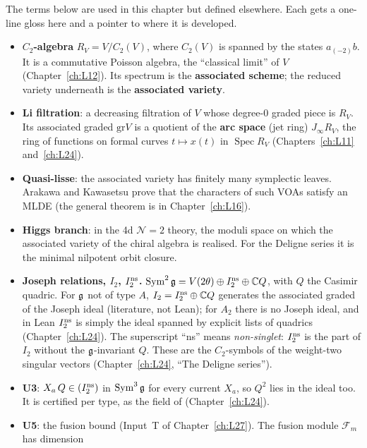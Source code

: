 The terms below are used in this chapter but defined elsewhere. Each gets a one-line gloss here and a pointer to
where it is developed.
\begin{itemize}
\item \textbf{$C_2$-algebra} $R_V=V/C_2(V)$, where $C_2(V)$ is spanned by the states $a_{(-2)}b$. It is a
  commutative Poisson algebra, the ``classical limit'' of $V$ (Chapter~\ref{ch:L12}). Its spectrum is the
  \textbf{associated scheme}; the reduced variety underneath is the \textbf{associated variety}.
\item \textbf{Li filtration}: a decreasing filtration of $V$ whose degree-$0$ graded piece is $R_V$. Its associated
  graded $\mathrm{gr}V$ is a quotient of the \textbf{arc space} (jet ring) $J_\infty R_V$, the ring of functions on
  formal curves $t\mapsto x(t)$ in $\operatorname{Spec}R_V$ (Chapters~\ref{ch:L11} and~\ref{ch:L24}).
\item \textbf{Quasi-lisse}: the associated variety has finitely many symplectic leaves. Arakawa and Kawasetsu prove
  that the characters of such VOAs satisfy an MLDE (the general theorem is in Chapter~\ref{ch:L16}).
\item \textbf{Higgs branch}: in the 4d $\mathcal N=2$ theory, the moduli space on which the associated variety of the
  chiral algebra is realised. For the Deligne series it is the minimal nilpotent orbit closure.
\item \textbf{Joseph relations, $I_2$, $I_2^{\rm ns}$.} $\operatorname{Sym}^2\mathfrak g=V(2\theta)\oplus
  I_2^{\rm ns}\oplus{\mathbb{C}} Q$, with $Q$ the Casimir quadric. For $\mathfrak g$ not of type $A$, $I_2=I_2^{\rm ns}\oplus{\mathbb{C}} Q$
  generates the associated graded of the Joseph ideal (literature, not Lean); for $A_2$ there is no Joseph ideal, and
  in Lean $I_2^{\rm ns}$ is simply the ideal spanned by explicit lists of quadrics (Chapter~\ref{ch:L24}). The superscript ``ns'' means \emph{non-singlet}: $I_2^{\rm ns}$ is the part of $I_2$ without
  the $\mathfrak g$-invariant $Q$. These are the $C_2$-symbols of the weight-two singular vectors (Chapter~\ref{ch:L24},
  ``The Deligne series'').
\item \textbf{U3}: $X_a\,Q\in(I_2^{\rm ns})$ in $\operatorname{Sym}^3\mathfrak g$ for every current $X_a$, so $Q^2$ lies in
  the ideal too. It is certified per type, as the field  of  (Chapter~\ref{ch:L24}).
\item \textbf{U5}: the fusion bound (Input~T of Chapter~\ref{ch:L27}). The fusion module $\mathcal F_m$ has dimension

\end{itemize}
